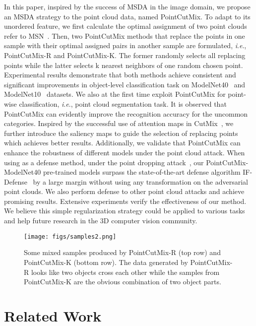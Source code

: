 \documentclass{article}
\newcommand{\ie}{\textit{i}.\textit{e}.}
\begin{document}
In this paper, inspired by the success of MSDA in the image domain, we propose an MSDA strategy to the point cloud data, named PointCutMix. To adapt to its unordered feature, we first calculate the optimal assignment of two point clouds refer to MSN~\cite{MSN}. Then, two PointCutMix methods that replace the points in one sample with their optimal assigned pairs in another sample are formulated, \ie, PointCutMix-R and PointCutMix-K. The former randomly selects all replacing points while the latter selects k nearest neighbors of one random chosen point.
Experimental results demonstrate that both methods achieve consistent and significant improvements in object-level classification task on ModelNet40~\cite{modelnet40} and ModelNet10~\cite{modelnet40} datasets. We also at the first time exploit PointCutMix for point-wise classification, \ie, point cloud segmentation task. It is observed that PointCutMix can evidently improve the recognition accuracy for the uncommon categories. 
Inspired by the successful use of attention maps in CutMix~\cite{walawalkar2020attentive}, we further introduce the saliency maps to guide the selection of replacing points which achieves better results.
Additionally, we validate that PointCutMix can enhance the robustness of different models under the point cloud attack. When using as a defense method, under the point dropping attack~\cite{pointcloudsaliencymaps}, our PointCutMix-ModelNet40 pre-trained models surpass the state-of-the-art defense algorithm IF-Defense~\cite{ifdefense} by a large margin without using any transformation on the adversarial point clouds. We also perform defense to other point cloud attacks and achieve promising results.
Extensive experiments verify the effectiveness of our method. We believe this simple regularization strategy could be applied to various tasks and help future research in the 3D computer vision community.

\begin{figure*}[t]
\centering
\vskip 0.2in
\centerline{\texttt{[image: figs/samples2.png]}}
\caption{Some mixed samples produced by PointCutMix-R (top row) and PointCutMix-K (bottom row). The data generated by PointCutMix-R looks like two objects cross each other while the samples from PointCutMix-K are the obvious combination of two object parts.}
\label{sample}
\vskip -0.2in
\end{figure*}



\section{Related Work}
\end{document}
